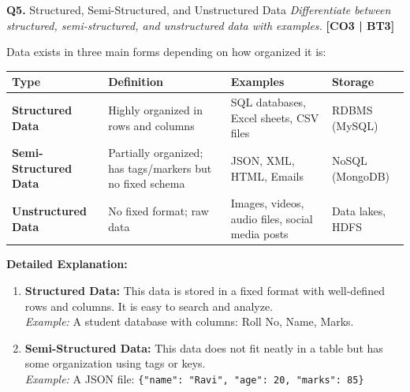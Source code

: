 \documentclass[12pt,a4paper]{article}
\newcommand{\Qno}[1]{\textbf{\color{darkred}Q#1.}}
\newcommand{\term}[1]{\textbf{\color{headingcolor}#1}}
\begin{document}
\vspace{8pt}

\begin{questionbox}{\Qno{5} Structured, Semi-Structured, and Unstructured Data}
\textit{Differentiate between structured, semi-structured, and unstructured data with examples.} \hfill \textbf{[CO3 | BT3]}
\end{questionbox}

\begin{answerenv}

Data exists in three main forms depending on how organized it is:

\vspace{6pt}
\begin{center}
\begin{tabular}{>{\bfseries}p{2.8cm} p{3.8cm} p{3.8cm} p{3cm}}
\toprule
\textbf{Type} & \textbf{Definition} & \textbf{Examples} & \textbf{Storage} \\
\midrule
Structured Data & Highly organized in rows and columns & SQL databases, Excel sheets, CSV files & RDBMS (MySQL) \\[6pt]
Semi-Structured Data & Partially organized; has tags/markers but no fixed schema & JSON, XML, HTML, Emails & NoSQL (MongoDB) \\[6pt]
Unstructured Data & No fixed format; raw data & Images, videos, audio files, social media posts & Data lakes, HDFS \\
\bottomrule
\end{tabular}
\end{center}

\vspace{6pt}
\textbf{\color{headingcolor}Detailed Explanation:}

\begin{enumerate}[leftmargin=1.8em, itemsep=4pt]
  \item \term{Structured Data:} This data is stored in a fixed format with well-defined rows and columns. It is easy to search and analyze.\\
  \textit{Example:} A student database with columns: Roll No, Name, Marks.

  \item \term{Semi-Structured Data:} This data does not fit neatly in a table but has some organization using tags or keys.\\
  \textit{Example:} A JSON file: \texttt{\{"name": "Ravi", "age": 20, "marks": 85\}}


\end{enumerate}
\end{answerenv}
\end{document}
